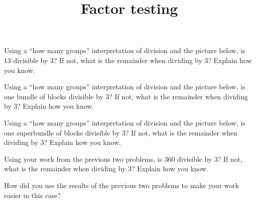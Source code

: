 \documentclass[nooutcomes,noauthor,handout]{ximera}
\title{Factor testing}
\begin{document}
\begin{abstract}
\end{abstract}

\maketitle


\begin{problem}
Using a ``how many groups'' interpretation of division and the picture below, is $13$ divisible by $3$? If not, what is the remainder when dividing by $3$? Explain how you know.

\begin{image} \end{image}
\end{problem}

\begin{problem}
Using a ``how many groups'' interpretation of division and the picture below, is one bundle of blocks divisible by $3$? If not, what is the remainder when dividing by $3$? Explain how you know.

\begin{center} \end{center}
\end{problem}


\begin{problem}
Using a ``how many groups'' interpretation of division and the picture below, is one superbundle of blocks divisible by $3$? If not, what is the remainder when dividing by $3$? Explain how you know.

\begin{image} \end{image}
\end{problem}

\newpage

\begin{problem}
Using your work from the previous two problems, is $360$ divisible by $3$? If not, what is the remainder when dividing by $3$? Explain how you know.

\begin{image} \end{image}

How did you use the results of the previous two problems to make your work easier in this case?
\end{problem}
\end{document}
